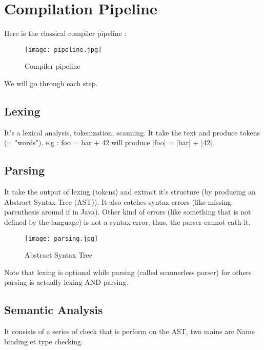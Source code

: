\chapter{Compilation Pipeline}
\label{chap:compilation_pipeline}

Here is the classical compiler pipeline :
\begin{figure}[H]
     \centering
     \texttt{[image: pipeline.jpg]}
     \caption{Compiler pipeline}
     \label{fig:compiler_pipeline}
\end{figure}
We will go through each step.

\section{Lexing}
    \theoremstyle{definition}
    \begin{definition}[Lexing]
        It's a lexical analysis, tokenization, scanning. It take the text and
        produce tokens (= "words"). e.g : foo = bar + 42 will produce |foo| = |bar| + |42|.
    \end{definition}
\section{Parsing}
    \theoremstyle{definition}
    \begin{definition}[Parsing]
        It take the output of lexing (tokens) and extract it's structure (by
        producing an Abstract Syntax Tree (AST)). It also catches syntax errors
        (like missing parenthesis around if in Java). Other kind of errors (like
        something that is not defined by the language) is not a syntax error,
        thus, the parser cannot cath it.
    \end{definition}
    \begin{figure}[H]
         \centering
         \texttt{[image: parsing.jpg]}
         \caption{Abstract Syntax Tree}
         \label{fig:ast}
    \end{figure}

    Note that lexing is optional while parsing (called scannerless parser) for
    others parsing is actually lexing AND parsing.
\section{Semantic Analysis}
    It consists of a series of check that is perform on the AST, two mains are
    Name binding et type checking.
